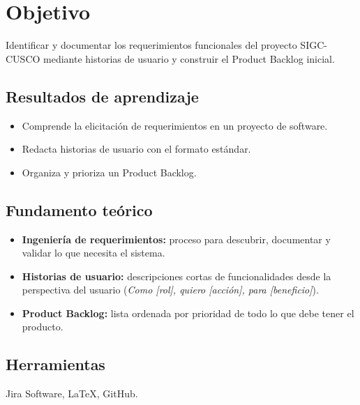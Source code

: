 \section{Objetivo}

Identificar y documentar los requerimientos funcionales del proyecto SIGC-CUSCO mediante historias de usuario y construir el Product Backlog inicial.

\subsection{Resultados de aprendizaje}
\begin{itemize}[nosep]
    \item Comprende la elicitación de requerimientos en un proyecto de software.
    \item Redacta historias de usuario con el formato estándar.
    \item Organiza y prioriza un Product Backlog.
\end{itemize}

\subsection{Fundamento teórico}
\begin{itemize}[nosep]
    \item \textbf{Ingeniería de requerimientos:} proceso para descubrir, documentar y validar lo que necesita el sistema.
    \item \textbf{Historias de usuario:} descripciones cortas de funcionalidades desde la perspectiva del usuario (\textit{Como [rol], quiero [acción], para [beneficio]}).
    \item \textbf{Product Backlog:} lista ordenada por prioridad de todo lo que debe tener el producto.
\end{itemize}

\subsection{Herramientas}
Jira Software, \LaTeX{}, GitHub.

